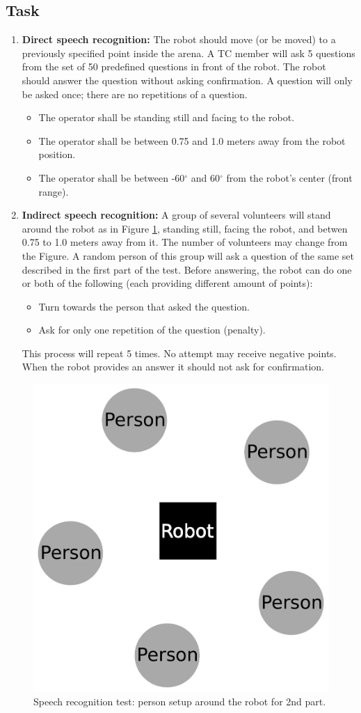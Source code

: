 \subsection{Task}

\begin{enumerate}
\item \textbf{Direct speech recognition: } The robot should move (or be moved) to a previously specified point inside the arena. 
  A TC member will ask 5 questions from the set of 50 predefined questions in front of the robot. 
  The robot should answer the question without asking confirmation.
  A question will only be asked once; there are no repetitions of a question. 
\begin{itemize}
\item The operator shall be standing still and facing to the robot.
\item The operator shall be between 0.75 and 1.0 meters away from the robot position.
\item The operator shall be between -60$^{\circ}$ and 60$^{\circ}$ from the robot's center (front range).
\end{itemize}
\item \textbf{Indirect speech recognition: } A group of several volunteers will stand around the robot as in Figure \ref{fig:asrsetup}, standing still, facing the robot, and betwen 0.75 to 1.0 meters away from it. The number of volunteers may change from the Figure. A random person of this group will ask a question of the same set described in the first part of the test. Before answering, the robot can do one or both of the following (each providing different amount of points):
\begin{itemize}
\item Turn towards the person that asked the question.
\item Ask for only one repetition of the question (penalty).
\end{itemize}
This process will repeat 5 times. No attempt may receive negative points. When the robot provides an answer it should not ask for confirmation.
\end{enumerate}

\begin{figure}[!h]
	\centering
	\includegraphics[width=0.5\columnwidth]{images/asrsetup.pdf}
	\caption{Speech recognition test: person setup around the robot for 2nd part.}
	\label{fig:asrsetup}
\end{figure}



